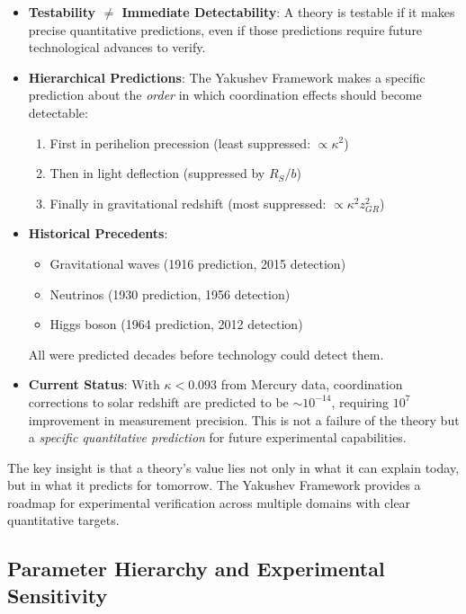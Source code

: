 \documentclass[11pt,a4paper]{article}
\begin{document}
	\begin{itemize}
		\item \textbf{Testability $\neq$ Immediate Detectability}: A theory is testable if it makes precise quantitative predictions, even if those predictions require future technological advances to verify.
		
		\item \textbf{Hierarchical Predictions}: The Yakushev Framework makes a specific prediction about the \emph{order} in which coordination effects should become detectable:
		\begin{enumerate}
			\item First in perihelion precession (least suppressed: $\propto \kappa^2$)
			\item Then in light deflection (suppressed by $R_S/b$)
			\item Finally in gravitational redshift (most suppressed: $\propto \kappa^2 z_{GR}^2$)
		\end{enumerate}
		
		\item \textbf{Historical Precedents}:
		\begin{itemize}
			\item Gravitational waves (1916 prediction, 2015 detection)
			\item Neutrinos (1930 prediction, 1956 detection)
			\item Higgs boson (1964 prediction, 2012 detection)
		\end{itemize}
		All were predicted decades before technology could detect them.
		
		\item \textbf{Current Status}: With $\kappa < 0.093$ from Mercury data, coordination corrections to solar redshift are predicted to be $\sim 10^{-14}$, requiring $10^7$ improvement in measurement precision. This is not a failure of the theory but a \emph{specific quantitative prediction} for future experimental capabilities.
	\end{itemize}
	
	The key insight is that a theory's value lies not only in what it can explain today, but in what it predicts for tomorrow. The Yakushev Framework provides a roadmap for experimental verification across multiple domains with clear quantitative targets.
	\subsection{Parameter Hierarchy and Experimental Sensitivity}
	
\end{document}
